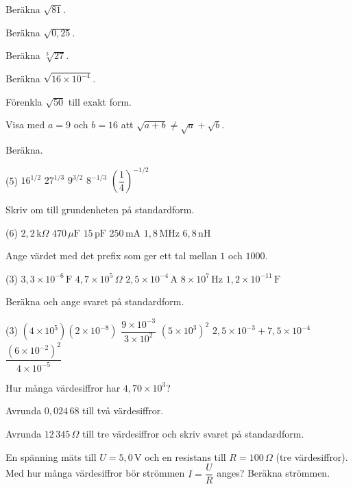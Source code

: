 \begin{parts}
  \item Beräkna $\sqrt{81}$.
  \item Beräkna $\sqrt{0{,}25}$.
  \item Beräkna $\sqrt[3]{27}$.
  \item Beräkna $\sqrt{16 \times 10^{-4}}$.
  \item Förenkla $\sqrt{50}$ till exakt form.
  \item Visa med $a = 9$ och $b = 16$ att $\sqrt{a + b} \neq \sqrt{a} + \sqrt{b}$.
\end{parts}

Beräkna.
\begin{delar}(5)
  \task $16^{1/2}$
  \task $27^{1/3}$
  \task $9^{3/2}$
  \task $8^{-1/3}$
  \task $\left(\dfrac{1}{4}\right)^{-1/2}$
\end{delar}

Skriv om till grundenheten på standardform.
\begin{delar}(6)
  \task $2{,}2\,\text{k}\Omega$
  \task $470\,\mu\text{F}$
  \task $15\,\text{pF}$
  \task $250\,\text{mA}$
  \task $1{,}8\,\text{MHz}$
  \task $6{,}8\,\text{nH}$
\end{delar}

Ange värdet med det prefix som ger ett tal mellan $1$ och $1000$.
\begin{delar}(3)
  \task $3{,}3 \times 10^{-6}\,\text{F}$
  \task $4{,}7 \times 10^{5}\,\Omega$
  \task $2{,}5 \times 10^{-4}\,\text{A}$
  \task $8 \times 10^{7}\,\text{Hz}$
  \task $1{,}2 \times 10^{-11}\,\text{F}$
\end{delar}

Beräkna och ange svaret på standardform.
\begin{delar}(3)
  \task $\left(4 \times 10^5\right)\left(2 \times 10^{-8}\right)$
  \task $\dfrac{9 \times 10^{-3}}{3 \times 10^{2}}$
  \task $\left(5 \times 10^3\right)^2$
  \task $2{,}5 \times 10^{-3} + 7{,}5 \times 10^{-4}$
  \task $\dfrac{\left(6 \times 10^{-2}\right)^2}{4 \times 10^{-5}}$
\end{delar}

\begin{parts}
  \item Hur många värdesiffror har $4{,}70 \times 10^3$?
  \item Avrunda $0{,}024\,68$ till två värdesiffror.
  \item Avrunda $12\,345\,\Omega$ till tre värdesiffror och skriv svaret på standardform.
  \item En spänning mäts till $U = 5{,}0\,\text{V}$ och en resistans till $R = 100\,\Omega$ (tre
    värdesiffror). Med hur många värdesiffror bör strömmen $I = \dfrac{U}{R}$ anges? Beräkna
    strömmen.
\end{parts}

